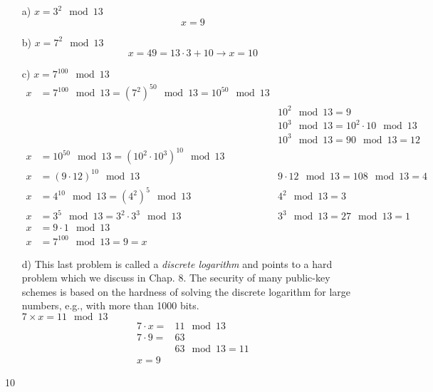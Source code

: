 \documentclass{article}
\begin{document}
\begin{enumerate}
  \setlength{\itemsep}{20pt}%
  \item[a)]  $x = 3^2 \mod 13$
  $$ \boxed{x = 9} $$

  \item[b)] $x = 7^2 \mod 13$
  $$ x = 49 = 13 \cdot 3 + 10 \rightarrow \boxed{x = 10}$$
  \item[c)] $x = 7^{100} \mod 13$
  \begin{align*}
  x &= 7^{100} \mod 13 = (7^2)^{50} \mod 13 = 10^{50} \mod 13 	& 												\\
  	&														  	& 10^2 \mod 13 = 9								\\
  	&							  	  						  	& 10^3 \mod 13 = 10^2 \cdot 10 \mod 13 			\\
  	&														  	& 10^3 \mod 13 = 90 \mod 13 = 12				\\
  x &= 10^{50} \mod 13 = (10^2 \cdot 10^3)^{10} \mod 13 		& 												\\
  x &= (9 \cdot 12)^{10} \mod 13								& 9 \cdot 12 \mod 13 = 108 \mod 13 = 4 			\\
  x &= 4^{10} \mod 13 = (4^2)^5 \mod 13						  	& 4^2 \mod 13 = 3 \\
  x &= 3^5 \mod 13 = 3^2 \cdot 3^3 \mod 13					  	& 3^3 \mod 13 = 27 \mod 13 = 1 					\\
  x &= 9 \cdot 1 \mod 13 									  	& 												\\
  x &= 7^{100} \mod 13 = \boxed{9 = x}							&									
  \end{align*}
  
  \newpage
  \item[d)] This last problem is called a \emph{discrete logarithm} and points to a hard problem which we discuss in Chap. 8. The security of many public-key schemes is based on the hardness of solving the discrete logarithm for large numbers, e.g., with more than 1000 bits.\\$7\times x = 11 \mod 13$
  \begin{align*}
  7 \cdot x = & 11 \mod 13 \\
  7 \cdot 9 = & 63 \\
  			  & 63 \mod 13 = 11 \\
  \boxed{x = 9} &
  \end{align*} 
\end{enumerate}

\setcounter{subsection} {10}
\end{document}
